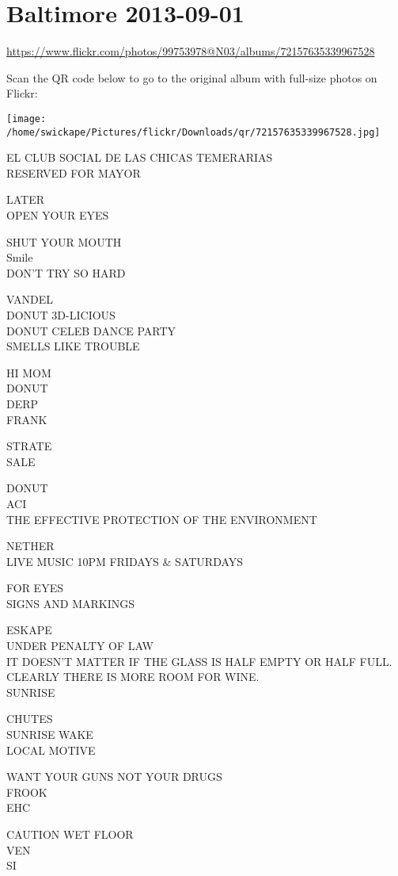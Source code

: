 \documentclass[10pt,letterpaper]{article}
\begin{document}
\section*{Baltimore 2013-09-01}

\url{https://www.flickr.com/photos/99753978@N03/albums/72157635339967528}

Scan the QR code below to go to the original album with full-size photos on Flickr:

\texttt{[image: /home/swickape/Pictures/flickr/Downloads/qr/72157635339967528.jpg]}
\pagebreak

EL CLUB SOCIAL DE LAS CHICAS TEMERARIAS\\
RESERVED FOR MAYOR

LATER\\
OPEN YOUR EYES

SHUT YOUR MOUTH\\
Smile\\
DON'T TRY SO HARD

VANDEL\\
DONUT 3D{-}LICIOUS\\
DONUT CELEB DANCE PARTY\\
SMELLS LIKE TROUBLE

HI MOM\\
DONUT\\
DERP\\
FRANK

STRATE\\
SALE

DONUT\\
ACI\\
THE EFFECTIVE PROTECTION OF THE ENVIRONMENT

NETHER\\
LIVE MUSIC 10PM FRIDAYS \& SATURDAYS

FOR EYES\\
SIGNS AND MARKINGS

ESKAPE\\
UNDER PENALTY OF LAW\\
IT DOESN'T MATTER IF THE GLASS IS HALF EMPTY OR HALF FULL.  CLEARLY THERE IS MORE ROOM FOR WINE.\\
SUNRISE

CHUTES\\
SUNRISE WAKE\\
LOCAL MOTIVE

WANT YOUR GUNS NOT YOUR DRUGS\\
FROOK\\
EHC

CAUTION WET FLOOR\\
VEN\\
SI
\end{document}

